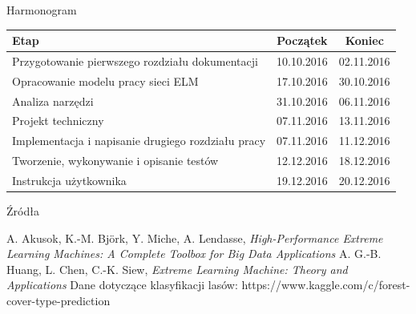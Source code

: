 \documentclass{beamer}
\begin{document}
\begin{frame}{Harmonogram}
\begin{table}[H]
\begin{tabular}{| L{6cm} |c|c|}
\hline
\textbf{Etap} & \textbf{Początek} & \textbf{Koniec} \\

\hline
Przygotowanie pierwszego rozdziału dokumentacji & 10.10.2016 & 02.11.2016 \\
\hline
Opracowanie modelu pracy sieci ELM & 17.10.2016 & 30.10.2016 \\
\hline
Analiza narzędzi &  31.10.2016 & 06.11.2016 \\
\hline
Projekt techniczny &  07.11.2016 & 13.11.2016 \\
\hline
Implementacja i napisanie drugiego rozdziału pracy & 07.11.2016 & 11.12.2016 \\
\hline
Tworzenie, wykonywanie i opisanie testów & 12.12.2016 & 18.12.2016 \\
\hline
Instrukcja użytkownika & 19.12.2016 & 20.12.2016 \\
\hline
\end{tabular}
\end{table}
\end{frame}
\begin{frame}{Źródła}
\begin{thebibliography}{9}
  A. Akusok, K.-M. Björk, Y. Miche, A. Lendasse,
  \emph{High-Performance Extreme Learning Machines: A Complete Toolbox for Big Data Applications}
  A. G.-B. Huang, L. Chen, C.-K. Siew, 
  \emph{Extreme Learning Machine: Theory and Applications}
	Dane dotyczące klasyfikacji lasów: https://www.kaggle.com/c/forest-cover-type-prediction
\end{thebibliography}
\end{frame}
\end{document}
